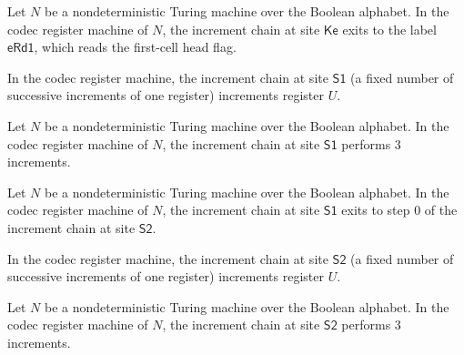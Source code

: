 \begin{lemma}
\label{Complexity.Codec.icNext_Ke}
\leanok
{}
Let $N$ be a nondeterministic Turing machine over the Boolean alphabet. In the codec
register machine of $N$, the increment chain at site $\mathsf{Ke}$ exits to the label
$\mathsf{eRd1}$, which reads the first-cell head flag.
\end{lemma}

\begin{lemma}
\label{Complexity.Codec.icReg_S1}
\leanok
{}
In the codec register machine, the increment chain at site $\mathsf{S1}$ (a fixed number
of successive increments of one register) increments register $U$.
\end{lemma}

\begin{lemma}
\label{Complexity.Codec.icCount_S1}
\leanok
{}
Let $N$ be a nondeterministic Turing machine over the Boolean alphabet. In the codec
register machine of $N$, the increment chain at site $\mathsf{S1}$ performs $3$
increments.
\end{lemma}

\begin{lemma}
\label{Complexity.Codec.icNext_S1}
\leanok
{}
Let $N$ be a nondeterministic Turing machine over the Boolean alphabet. In the codec
register machine of $N$, the increment chain at site $\mathsf{S1}$ exits to step $0$ of
the increment chain at site $\mathsf{S2}$.
\end{lemma}

\begin{lemma}
\label{Complexity.Codec.icReg_S2}
\leanok
{}
In the codec register machine, the increment chain at site $\mathsf{S2}$ (a fixed number
of successive increments of one register) increments register $U$.
\end{lemma}

\begin{lemma}
\label{Complexity.Codec.icCount_S2}
\leanok
{}
Let $N$ be a nondeterministic Turing machine over the Boolean alphabet. In the codec
register machine of $N$, the increment chain at site $\mathsf{S2}$ performs $3$
increments.
\end{lemma}

